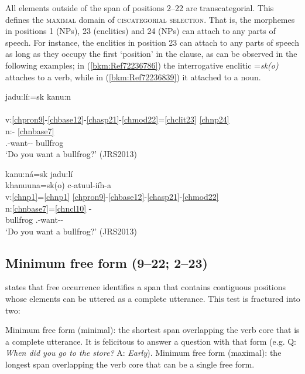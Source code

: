 \documentclass[output=paper]{langscibook}
\begin{document}
All elements outside of the span of positions 2--22  are transcategorial. This defines the \textsc{maximal} domain of \textsc{ciscategorial} \textsc{selection}. That is, the morphemes in positions 1 (NPs), 23 (enclitics) and 24 (NPs) can attach to any parts of speech. For instance, the enclitics in position 23 can attach to any parts of speech as long as they occupy the first `position' in the clause, as can be observed in the following examples; in (\ref{bkm:Ref72236786}) the interrogative enclitic =\textit{sk(o)} attaches to a verb, while in (\ref{bkm:Ref72236839}) it attached to a noun. 

\ea\label{bkm:Ref72236786}jadu:lí:=sk kanu:n \\
\\
v:\ref{chpron9}-\ref{chbase12}-\ref{chasp21}-\ref{chmod22}=\ref{chclit23} \ref{chnp24}\\
n:- \ref{chnbase7}\\ 
\Second\Sg.\Barg{}-want-\Prs{}-\Ind{} bullfrog\\
\glt `Do you want a bullfrog?' (JRS2013)
\z 

\ea\label{bkm:Ref72236839}kanu:ná=sk jadu:lí \\
\gllll khanuuna=sk(o) c-atuul-iíh-a \\
v:\ref{chnp1}=\ref{chnp1} \ref{chpron9}-\ref{chbase12}-\ref{chasp21}-\ref{chmod22}\\
n:\ref{chnbase7}=\ref{chncl10} -\\ 
bullfrog \Second\Sg.\Barg{}-want-\Prs{}-\Ind{}\\
\glt `Do you want a bullfrog?' (JRS2013)
\z 


\subsection{Minimum free form (9--22; 2--23)} 
\label{bkm:Ref87350406}
\citet[18]{Tallman2020} states that free occurrence identifies a span that contains contiguous positions whose elements can be uttered as a complete utterance. This test is fractured into two:

\ea\label{ex:cher:key:58} Minimum free form (minimal): the shortest span overlapping the verb core that is a complete utterance. It is felicitous to answer a question with that form (e.g. Q: \textit{When did you go to the store?} A: \textit{Early}).
\z 
\ea\label{ex:cher:key:59} Minimum free form (maximal): the longest span overlapping the verb core that can be a single free form.
\z 
\end{document}
